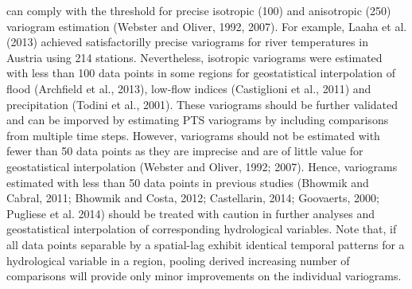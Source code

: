 \clearpage

\noindent can comply with the threshold for precise isotropic (100) and anisotropic (250) variogram estimation (Webster and Oliver, 1992, 2007). For example, Laaha et al. (2013) achieved satisfactorilly precise variograms for river temperatures in Austria using 214 stations. Nevertheless, isotropic variograms were estimated with less than 100 data points in some regions for geostatistical interpolation of flood (Archfield et al., 2013), low-flow indices (Castiglioni et al., 2011) and precipitation (Todini et al., 2001). These variograms should be further validated and can be imporved by estimating PTS variograms by including comparisons from multiple time steps. However, variograms should not be estimated with fewer than 50 data points as they are imprecise and are of little value for geostatistical interpolation (Webster and Oliver, 1992; 2007). Hence, variograms estimated with less than 50 data points in previous studies (Bhowmik and Cabral, 2011; Bhowmik and Costa, 2012; Castellarin, 2014; Goovaerts, 2000; Pugliese et al. 2014) should be treated with caution in further analyses and geostatistical interpolation of corresponding hydrological variables. Note that, if all data points separable by a spatial-lag exhibit identical temporal patterns for a hydrological variable in a region, pooling derived increasing number of comparisons will provide only minor improvements on the individual variograms.

